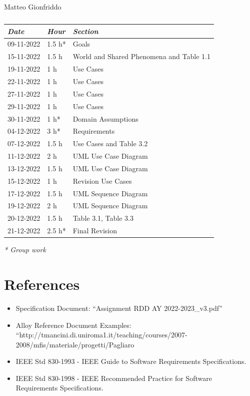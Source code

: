 \documentclass[a4paper]{report}
\begin{document}
\begin{table}[H]
\centering

Matteo Gionfriddo\\
\begin{tabular}{p{2cm}p{1.5cm}p{7cm}}
\toprule
\textit{Date} & \textit{Hour} & \textit{Section} \\ \midrule
09-11-2022 & 1.5 h* & Goals \\ \midrule
15-11-2022 & 1.5 h & World and Shared Phenomena and Table 1.1 \\ \midrule
19-11-2022 & 1 h & Use Cases\\ \midrule
22-11-2022 & 1 h & Use Cases \\ \midrule
27-11-2022 & 1 h & Use Cases \\ \midrule
29-11-2022 & 1 h & Use Cases \\ \midrule
30-11-2022 & 1 h* & Domain Assumptions \\ \midrule
04-12-2022 & 3 h* & Requirements \\ \midrule
07-12-2022 & 1.5 h & Use Cases and Table 3.2\\ \midrule
11-12-2022 & 2 h & UML Use Case Diagram\\  \midrule
13-12-2022 & 1.5 h & UML Use Case Diagram\\  \midrule
15-12-2022 & 1 h & Revision Use Cases\\ \midrule
17-12-2022 & 1.5 h & UML Sequence Diagram\\ \midrule
19-12-2022 & 2 h & UML Sequence Diagram\\ \midrule
20-12-2022 & 1.5 h & Table 3.1, Table 3.3 \\ \midrule
21-12-2022 & 2.5 h* & Final Revision \\ \midrule

\bottomrule
\end{tabular}
\caption[Matteo Gionfriddo's effort table]{}
\end{table}
\textit{* Group work}
\chapter{References}
\begin{itemize}
\item Specification Document: “Assignment RDD AY 2022-2023\_v3.pdf”
\item Alloy Reference Document Examples: “http://tmancini.di.uniroma1.it/teaching/courses/2007-2008/mfis/materiale/progetti/Pagliaro%
\item IEEE Std 830-1993 - IEEE Guide to Software Requirements Specifications.
\item IEEE Std 830-1998 - IEEE Recommended Practice for Software Requirements Specifications.
\end{itemize}
\end{document}
